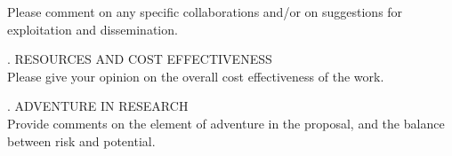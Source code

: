 \vs
{\sc Please comment on any specific collaborations and/or on suggestions
for exploitation and dissemination.}

{.  RESOURCES AND COST EFFECTIVENESS}\\


\vs
{\sc Please give your opinion on the overall cost effectiveness of the
work.}

{.  ADVENTURE IN RESEARCH}\\


\vs
{\sc Provide comments on the element of adventure in the proposal,
and the balance between risk and potential.}



